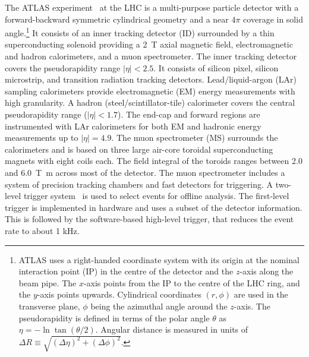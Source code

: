 \newcommand{\AtlasCoordFootnote}{%
ATLAS uses a right-handed coordinate system with its origin at the nominal interaction point (IP)
in the centre of the detector and the \(z\)-axis along the beam pipe.
The \(x\)-axis points from the IP to the centre of the LHC ring,
and the \(y\)-axis points upwards.
Cylindrical coordinates \((r,\phi)\) are used in the transverse plane, 
\(\phi\) being the azimuthal angle around the \(z\)-axis.
The pseudorapidity is defined in terms of the polar angle \(\theta\) as \(\eta = -\ln \tan(\theta/2)\).
Angular distance is measured in units of \(\Delta R \equiv \sqrt{(\Delta\eta)^{2} + (\Delta\phi)^{2}}\).}

The ATLAS experiment~\cite{PERF-2007-01,ATLAS-TDR-2010-19,Abbott:2018ikt} at the LHC is a multi-purpose particle detector
with a forward-backward symmetric cylindrical geometry and a near \(4\pi\) coverage in 
solid angle.\footnote{\AtlasCoordFootnote}
It consists of an inner tracking detector (ID) surrounded by a thin superconducting solenoid
providing a \SI{2}{\tesla} axial magnetic field, electromagnetic and hadron calorimeters, and a muon spectrometer.
The inner tracking detector covers the pseudorapidity range \(|\eta| < 2.5\).
It consists of silicon pixel, silicon microstrip, and transition radiation tracking detectors.
Lead/liquid-argon (LAr) sampling calorimeters provide electromagnetic (EM) energy measurements
with high granularity.
A hadron (steel/scintillator-tile) calorimeter covers the central pseudorapidity range (\(|\eta| < 1.7\)).
The end-cap and forward regions are instrumented with LAr calorimeters
for both EM and hadronic energy measurements up to \(|\eta| = 4.9\).
The muon spectrometer (MS) surrounds the calorimeters and is based on
three large air-core toroidal superconducting magnets with eight coils each.
The field integral of the toroids ranges between \num{2.0} and \SI{6.0}{\tesla\metre}
across most of the detector. 
The muon spectrometer includes a system of precision tracking chambers and fast detectors for triggering.
A two-level trigger system~\cite{TRIG-2016-01} is used to select events for offline analysis. 
The first-level trigger is implemented in hardware and uses a subset of the detector information. 
This is followed by the software-based high-level trigger, that reduces the event rate to about 1 kHz.
